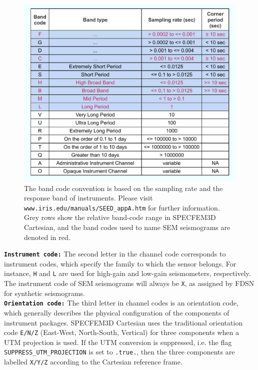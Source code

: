 \begin{figure}[ht]
\noindent \begin{centering}
\includegraphics[scale=0.6]{figures/IRIS_band_codes.pdf}
\par\end{centering}

\caption{The band code convention is based on the sampling rate and the response
band of instruments. Please visit \texttt{www.iris.edu/manuals/SEED\_appA.htm}
for further information. Grey rows show the relative band-code range
in SPECFEM3D Cartesian, and the band codes used to name SEM seismograms
are denoted in red.}


\label{fig:IRIS_band_codes}
\end{figure}


\noindent \texttt{\textbf{Instrument code:}} The second letter in
the channel code corresponds to instrument codes, which specify the
family to which the sensor belongs. For instance, \texttt{H} and \texttt{L}
are used for high-gain and low-gain seismometers, respectively. The
instrument code of SEM seismograms will always be \texttt{X}, as assigned
by FDSN for synthetic seismograms. \\


\noindent \texttt{\textbf{Orientation code:}} The third letter in
channel codes is an orientation code, which generally describes the
physical configuration of the components of instrument packages. SPECFEM3D
Cartesian uses the traditional orientation code \texttt{E/N/Z} (East-West,
North-South, Vertical) for three components when a UTM projection
is used. If the UTM conversion is suppressed, i.e. the flag \texttt{SUPPRESS\_UTM\_PROJECTION}
is set to \texttt{.true.}, then the three components are labelled
\texttt{X/Y/Z} according to the Cartesian reference frame. \\


